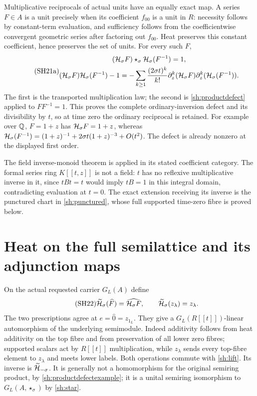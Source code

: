 Multiplicative reciprocals of actual units have an equally exact
map. A series $F\in A$ is a unit precisely when its coefficient
$f_{00}$ is a unit in $R$: necessity follows by constant-term
evaluation, and sufficiency follows from the coefficientwise
convergent geometric series after factoring out $f_{00}$.
Heat preserves this constant coefficient, hence preserves the
set of units. For every such $F$,
\begin{equation}\tag{SH21a}\label{sh:reciprocal}
 \begin{gathered}
 (\mathcal H_\sigma F)\star_\sigma\mathcal H_\sigma(F^{-1})=1,\\
 (\mathcal H_\sigma F)\mathcal H_\sigma(F^{-1})-1
 =-\sum_{k\ge1}\frac{(2\sigma t)^k}{k!}
       \partial_z^k(\mathcal H_\sigma F)
       \partial_z^k(\mathcal H_\sigma(F^{-1})).
 \end{gathered}
\end{equation}
The first is the transported multiplication law; the second is
\eqref{sh:productdefect} applied to $FF^{-1}=1$. This proves
the complete ordinary-inversion defect and its divisibility by
$t$, so at time zero the ordinary reciprocal is retained.
For example over $\mathbb Q$, $F=1+z$ has $\mathcal H_\sigma F=1+z$,
whereas
$\mathcal H_\sigma(F^{-1})=(1+z)^{-1}
 +2\sigma t(1+z)^{-3}+O(t^2)$.
The defect is already nonzero at the displayed first order.

The field inverse-monoid theorem is applied in its stated
coefficient category. The formal series ring $K[[t,z]]$ is
not a field: $t$ has no reflexive multiplicative inverse in
it, since $tBt=t$ would imply $tB=1$ in this integral domain,
contradicting evaluation at $t=0$. The exact extension receiving
its inverse is the punctured chart in \eqref{sh:punctured},
whose full supported time-zero fibre is proved below.

\section{Heat on the full semilattice and its adjunction maps}

On the actual requested carrier $G_L(A)$ define
\begin{equation}\tag{SH22}\label{sh:lift}
 \widetilde{\mathcal H}_\sigma(\widehat F)=\widehat{\mathcal H_\sigma F},
 \qquad
 \widetilde{\mathcal H}_\sigma(z_\lambda)=z_\lambda.
\end{equation}
The two prescriptions agree at $e=\widehat0=z_{1_L}$.
They give a $G_L(R[[t]])$-linear automorphism of the underlying
semimodule. Indeed additivity follows from heat additivity on
the top fibre and from preservation of all lower zero fibres;
supported scalars act by $R[[t]]$ multiplication, while
$z_\lambda$ sends every top-fibre element to $z_\lambda$ and
meets lower labels. Both operations commute with
\eqref{sh:lift}. Its inverse is $\widetilde{\mathcal H}_{-\sigma}$.
It is generally not a homomorphism for the original semiring
product, by \eqref{sh:productdefectexample}; it is a unital
semiring isomorphism to $G_L(A,\star_\sigma)$ by
\eqref{sh:star}.


